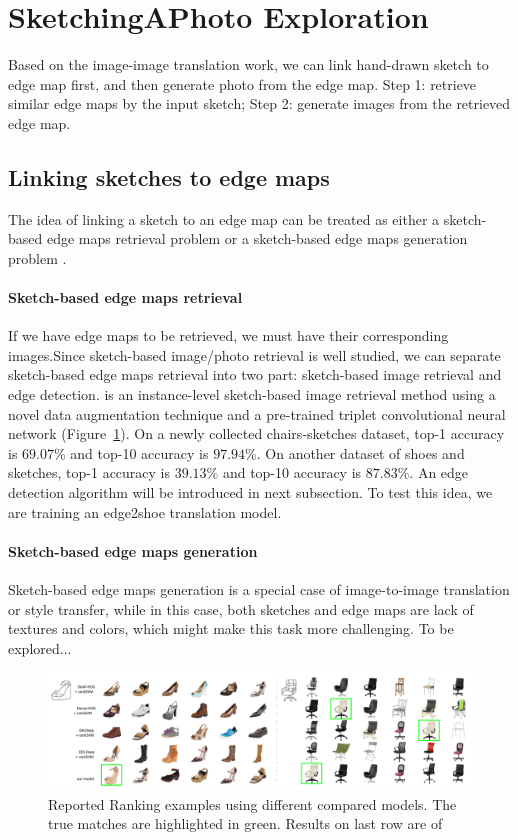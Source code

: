 \section{SketchingAPhoto Exploration}
Based on the image-image translation work, we can link hand-drawn sketch to edge map first, and then generate photo from the edge map. Step 1: retrieve similar edge maps by the input sketch; Step 2: generate images from the retrieved edge map.
\subsection{Linking sketches to edge maps}
The idea of linking a sketch to an edge map can be treated as either a sketch-based edge maps retrieval problem or a sketch-based edge maps generation problem .
\paragraph{Sketch-based edge maps retrieval}
If we have edge maps to be retrieved, we must have their corresponding images.Since sketch-based image/photo retrieval is well studied, we can separate sketch-based edge maps retrieval into two part: sketch-based image retrieval and edge detection. \cite{SketchMeThatShoe} is an instance-level sketch-based image retrieval method using a novel data augmentation technique and a pre-trained triplet convolutional neural network (Figure~\ref{reported_sketchmethatshoe}). On a newly collected chairs-sketches dataset, top-1 accuracy is $69.07\%$ and top-10 accuracy is $97.94\%$. On another dataset of shoes and sketches, top-1 accuracy is $39.13\%$ and top-10 accuracy is $87.83\%$. An edge detection algorithm will be introduced in next subsection. To test this idea, we are training an edge2shoe translation model.
\paragraph{Sketch-based edge maps generation}
Sketch-based edge maps generation is a special case of image-to-image translation or style transfer, while in this case, both sketches and edge maps are lack of textures and colors, which might make this task more challenging. 
To be explored...

\begin{figure}
	\includegraphics[width=\textwidth]{figures/pix2pix/reported_sketchmethatshoe}
	\caption{\label{reported_sketchmethatshoe}Reported Ranking examples using different compared models. The true matches are highlighted in green. Results on last row are of \cite{SketchMeThatShoe}}
\end{figure}

